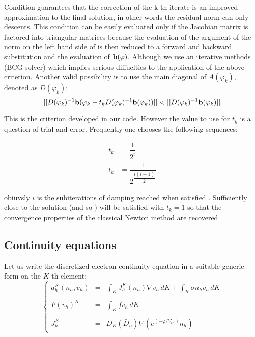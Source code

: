 Condition  guarantees that the correction of the k-th iterate is an improved approximation to the final solution, in other words the residual norm can only descents.
This condition can be easily evaluated only if the Jacobian matrix is factored into triangular matrices because the evaluation of the argument of the norm on the left hand side of  is then reduced to a forward and backward substitution and the evaluation of $\mathbf{b}(\varphi)$. Although we use an iterative methods (BCG solver) which implies serious diffuclties to the application of the above criterion. Another valid possibility is to use the main diagonal of $A(\varphi_k)$, denoted as $D(\varphi_k)$:
\begin{equation}
\label{eq: easy criterion}
||D(\varphi_k)^{-1}\vect{b}(\varphi_k-t_kD(\varphi_k)^{-1}\vect{b}(\varphi_k))||<||D(\varphi_k)^{-1}\vect{b}(\varphi_k)||
\end{equation}

This is the criterion developed in our code. However the value to use for $t_k$ is a question of trial and error. Frequently one chooses the following sequences:

\begin{align}
t_k & = \dfrac{1}{2^i} \\
t_k & = \dfrac{1}{2^{\dfrac{i(i+1)}{2}}}  
\end{align}

obiuvsly $i$ is the subiterations of damping reached when satisfied . Sufficiently close to the solution  (and so ) will be satisfied with $t_k=1$ so that the convergence properties of the classical Newton method are recovered.
 


 \subsection{Continuity equations}

Let us write the discretized electron continuity equation in a suitable generic form on the $K$-th element:
\begin{equation}
\label{eq: LEC discretized general}
\left\{
\begin{array}{rcl}
a_h^K(n_h,v_h) & = & \int_{K} J_h^K(n_h) \nabla v_h \, dK + \int_{K} \sigma n_h v_h \, dK 
\\
\\
F(v_h)^K & = & \int_K f v_h \, dK
\\
\\
J_h^K & = & D_K(\bar{D}_n) \nabla  (e^{(-\varphi / V_{th})}n_h)
\end{array}
\right.
\end{equation}

